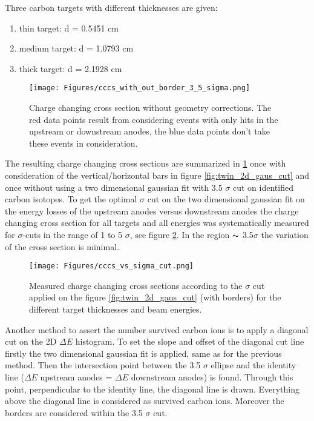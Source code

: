 Three carbon targets with different thicknesses are given:
\begin{enumerate}
\itemsep0em
\item thin target: d = 0.5451 cm
\item medium target: d = 1.0793 cm
\item thick target: d = 2.1928 cm 
\end{enumerate}
\begin{figure}[htpb]
    \centering
    \texttt{[image: Figures/cccs\_with\_out\_border\_3\_5\_sigma.png]}
    \caption{
    Charge changing cross section without geometry corrections. The red data points result from considering events with only hits in the upstream or downstream anodes, the blue data points don't take these events in consideration. 
     }
    \label{fig:cccs_with_out_border_3_5}
\end{figure}
The resulting charge changing cross sections are summarized in \ref{fig:cccs_with_out_border_3_5} once with consideration of the vertical/horizontal bars in figure \ref{fig:twin_2d_gaus_cut} and once without using a two dimensional gaussian fit with 3.5 $\sigma$ cut  on identified carbon isotopes. 
To get the optimal $\sigma$ cut on the two dimensional gaussian fit on the energy losses of the upstream anodes versus downstream anodes the charge changing cross section for all targets and all energies was systematically measured for $\sigma$-cuts in the range of 1 to 5 $\sigma$, see figure \ref{fig:cccs_vs_sigma_cut}. In the region $\thicksim$ 3.5$\sigma$ the variation of the cross section is minimal.
\begin{figure}[htpb]
    \centering
    \texttt{[image: Figures/cccs\_vs\_sigma\_cut.png]}
    \caption{
    Measured charge changing cross sections according to the $\sigma$ cut applied on the figure \ref{fig:twin_2d_gaus_cut} (with borders) for the different target thicknesses and beam energies.
     }
    \label{fig:cccs_vs_sigma_cut}
\end{figure}
Another method to assert the number survived carbon ions is to apply a diagonal cut on the 2D $\Delta E$ histogram. To set the slope and offset of the diagonal cut line firstly the two dimensional gaussian fit is applied, same as for the previous method. Then the intersection point between the 3.5 $\sigma$ ellipse and the identity line ($\Delta E$ upstream anodes = $\Delta E$ downstream anodes) is found. Through this point, perpendicular to the identity line, the diagonal line is drawn. Everything above the diagonal line is considered as survived carbon ions. Moreover the borders are considered within the 3.5 $\sigma$ cut. 


